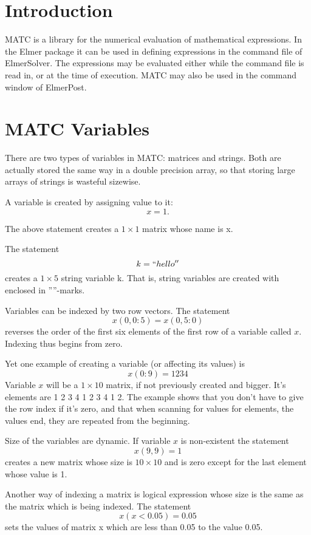 \section{Introduction}
MATC is a library for the numerical evaluation of mathematical expressions. In the Elmer 
package it can be used in defining expressions in the command file of ElmerSolver. The expressions
may be evaluated either while the command file is read in, or at the time of execution.
MATC may also be used in the command window of ElmerPost.   


\section{MATC Variables}

There are two types of variables in MATC: matrices and strings. 
Both are actually stored the same way in a double precision array, so that storing large arrays of strings is wasteful sizewise. 

A variable is created by assigning value to it: 
\[
  x = 1. 
\]
 
The above statement creates a $1 \times 1$ matrix whose name is x. 

The statement 
\[
  k = ``hello''
\]
 creates a $1 \times 5$ string variable k. That is, string variables are created with enclosed in ''''-marks. 

Variables can be indexed by two row vectors. The statement 
\[
   x(0,0:5) = x(0,5:0)
\]
reverses the order of the first six elements of the first row of a variable called $x$. 
Indexing thus begins from zero. 

Yet one example of creating a variable (or affecting its values) is 
\[
  x(0:9) = 1 2 3 4
\]
 Variable $x$ will be a $1 \times 10$ matrix, if not previously created and bigger. 
It's elements are 1 2 3 4 1 2 3 4 1 2.
The example shows that you don't have to give the row index if it's zero, and that when scanning for values for elements, the values end, they are repeated from the beginning. 

Size of the variables are dynamic. If variable $x$ is non-existent the statement 
\[
  x(9,9) = 1
\]
creates a new matrix whose size is $10 \times 10$ and is zero except for the last element whose value is 1. 

Another way of indexing a matrix is logical expression whose size is the same as the matrix which is being indexed. The statement 
\[
  x(x < 0.05) = 0.05
\]
sets the values of matrix x which are less than 0.05 to the value 0.05. 



